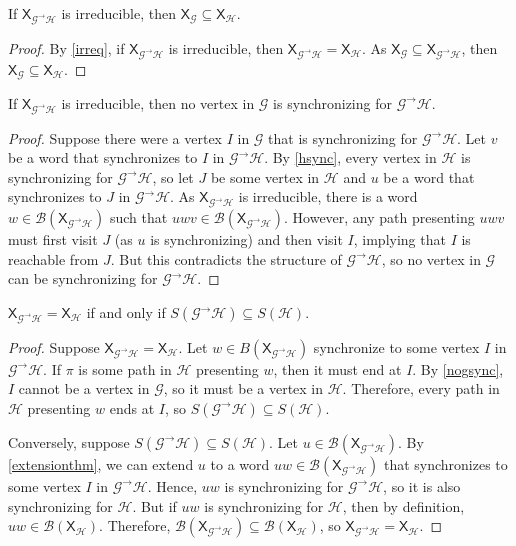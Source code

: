 \documentclass{article}
\newcommand{\Gc}{\mathcal{G}}  %
\newcommand{\Hc}{\mathcal{H}}  %
\newcommand{\Bc}{\mathcal{B}}
\newcommand{\GtH}{\Gc^\to\Hc}
\newcommand{\shift}[1]{\mathsf{X}_{#1}}
\theoremstyle{definition}
\begin{document}
\begin{corollary}
    If \(\shift{\GtH}\) is irreducible, then \(\shift{\Gc} \subseteq \shift{\Hc}\).
\end{corollary}

\begin{proof}
    By \ref{irreq}, if \(\shift{\GtH}\) is irreducible, then \(\shift{\GtH} = \shift{\Hc}\).
    As \(\shift{\Gc} \subseteq \shift{\GtH}\), then \(\shift{\Gc} \subseteq \shift{\Hc}\).
\end{proof}

\begin{theorem}\label{nogsync}
    If \(\shift{\GtH}\) is irreducible, then no vertex in \(\Gc\) is synchronizing for \(\GtH\).
\end{theorem}

\begin{proof}
    Suppose there were a vertex \(I\) in \(\Gc\) that is synchronizing for \(\GtH\). 
    Let \(v\) be a word that synchronizes to \(I\) in \(\GtH\). By \ref{hsync}, every vertex in \(\Hc\) 
    is synchronizing for \(\GtH\), so let \(J\) be some vertex in \(\Hc\) and \(u\) be a word that synchronizes to 
    \(J\) in \(\GtH\). As \(\shift{\GtH}\) is irreducible, there is a word \(w \in \Bc(\shift{\GtH})\) 
    such that \(uwv \in \Bc(\shift{\GtH})\). However, any path presenting \(uwv\) must first visit 
    \(J\) (as \(u\) is synchronizing) and then visit \(I\), implying that \(I\) is reachable 
    from \(J\). But this contradicts the structure of \(\GtH\), so no vertex in \(\Gc\) can be 
    synchronizing for \(\GtH\).
\end{proof}

\begin{theorem}
    \(\shift{\GtH} = \shift{\Hc}\) if and only if \(S(\GtH) \subseteq S(\Hc)\).
\end{theorem}

\begin{proof}
    Suppose \(\shift{\GtH} = \shift{\Hc}\). Let \(w \in B(\shift{\GtH})\) synchronize to some vertex \(I\)
    in \(\GtH\).
    If \(\pi\) is some path in \(\Hc\) presenting \(w\), then it must end at \(I\). By 
    \ref{nogsync}, \(I\) cannot be a vertex in \(\Gc\), so it must be a vertex in \(\Hc\).
    Therefore, every path in \(\Hc\) presenting \(w\) ends at \(I\), so \(S(\GtH) \subseteq S(\Hc)\).

    Conversely, suppose \(S(\GtH) \subseteq S(\Hc)\). Let \(u \in \Bc(\shift{\GtH})\).
    By \ref{extensionthm}, we can extend \(u\) to a word \(uw \in \Bc(\shift{\GtH})\) that 
    synchronizes to some vertex \(I\) in \(\GtH\). Hence, \(uw\) is synchronizing 
    for \(\GtH\), so it is also synchronizing for \(\Hc\). But if \(uw\) is synchronizing for
    \(\Hc\), then by definition, \(uw \in \Bc(\shift{\Hc})\). Therefore, \(\Bc(\shift{\GtH}) \subseteq \Bc(\shift{\Hc})\),
    so \(\shift{\GtH} = \shift{\Hc}\).
\end{proof}
\end{document}
